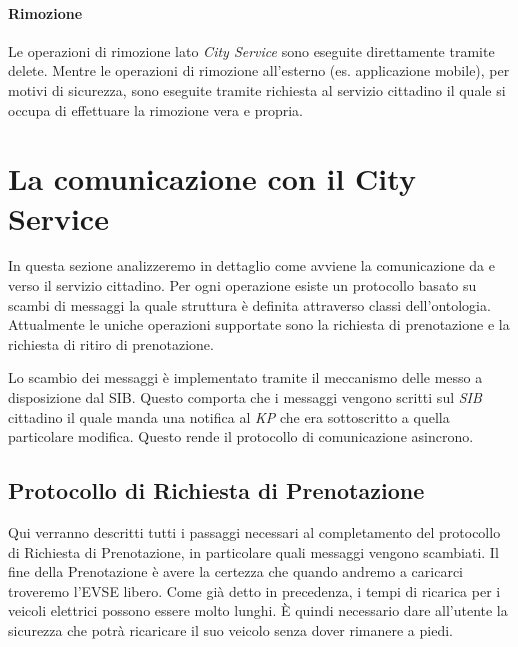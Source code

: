 \paragraph{Rimozione} Le operazioni di rimozione lato \emph{City Service} sono eseguite direttamente tramite  delete. Mentre le operazioni di rimozione all'esterno (es. applicazione mobile), per motivi di sicurezza, sono eseguite tramite richiesta al servizio cittadino il quale si occupa di effettuare la rimozione vera e propria.

\section{La comunicazione con il City Service}\label{sec:protocol}

In questa sezione analizzeremo in dettaglio come avviene la comunicazione da e verso il servizio cittadino. Per ogni operazione esiste un protocollo basato su scambi di messaggi la quale struttura è definita attraverso classi dell'ontologia. Attualmente le uniche operazioni supportate sono la richiesta di prenotazione e la richiesta di ritiro di prenotazione.

Lo scambio dei messaggi è implementato tramite il meccanismo delle  messo a disposizione dal SIB. Questo comporta che i messaggi vengono scritti sul \emph{SIB} cittadino il quale manda una notifica al \emph{KP} che era sottoscritto a quella particolare modifica. Questo rende il protocollo di comunicazione asincrono.


\subsection{Protocollo di Richiesta di Prenotazione}

Qui verranno descritti tutti i passaggi necessari al completamento del protocollo di Richiesta di Prenotazione, in particolare quali messaggi vengono scambiati. Il fine della Prenotazione è avere la certezza che quando andremo a caricarci troveremo l'EVSE libero. Come già detto in precedenza, i tempi di ricarica per i veicoli elettrici possono essere molto lunghi. È quindi necessario dare all'utente la sicurezza che potrà ricaricare il suo veicolo senza dover rimanere a piedi.

